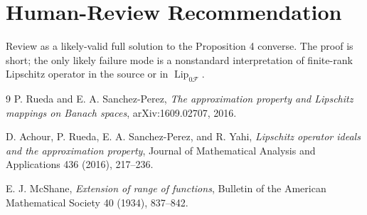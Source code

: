 \documentclass[11pt]{article}
\newcommand{\Lip}{\operatorname{Lip}}
\begin{document}
\section*{Human-Review Recommendation}

Review as a likely-valid full solution to the Proposition 4 converse.  The
proof is short; the only likely failure mode is a nonstandard interpretation
of finite-rank Lipschitz operator in the source or in \(\Lip_{0\mathcal F}\).

\begin{thebibliography}{9}
P. Rueda and E. A. Sanchez-Perez,
\emph{The approximation property and Lipschitz mappings on Banach spaces},
arXiv:1609.02707, 2016.

D. Achour, P. Rueda, E. A. Sanchez-Perez, and R. Yahi,
\emph{Lipschitz operator ideals and the approximation property},
Journal of Mathematical Analysis and Applications 436 (2016), 217--236.

E. J. McShane,
\emph{Extension of range of functions},
Bulletin of the American Mathematical Society 40 (1934), 837--842.
\end{thebibliography}
\end{document}

